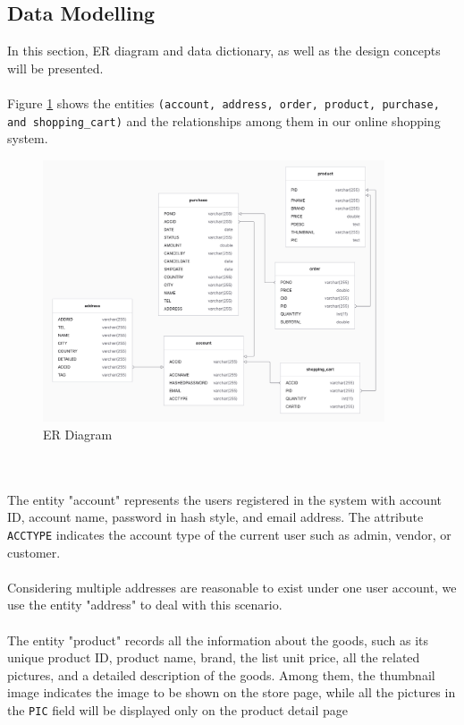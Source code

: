 \documentclass{article}
\begin{document}
\subsection{Data Modelling}
In this section, ER diagram and data dictionary, as well as the design concepts will be presented. 
\\\\
Figure \ref{fig:ER Diagram} shows the entities \verb|(account, address, order, product, purchase, and shopping_cart)| and the relationships among them in our online shopping system.
\begin{figure}[!htp]
    \centering
    \includegraphics[width=0.9\textwidth]{ER Diagram.png}
    \caption{\label{fig:ER Diagram}ER Diagram}
\end{figure}
\\\\
The entity "account" represents the users registered in the system with account ID, account name, password in hash style, and email address. The attribute \verb|ACCTYPE| indicates the account type of the current user such as admin, vendor, or customer. 
\\\\
Considering multiple addresses are reasonable to exist under one user account, we use the entity "address" to deal with this scenario.
\\\\
The entity "product" records all the information about the goods, such as its unique product ID, product name, brand, the list unit price, all the related pictures, and a detailed description of the goods. Among them, the thumbnail image indicates the image to be shown on the store page, while all the pictures in the \verb|PIC| field will be displayed only on the product detail page
\end{document}
